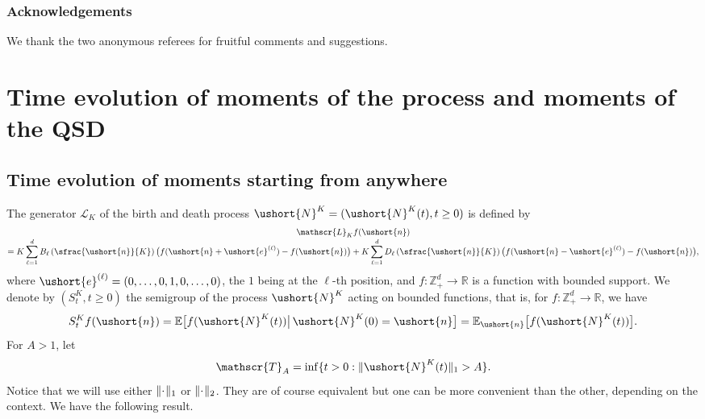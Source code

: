 \documentclass[JEP,XML,SOM,Unicode]{cedram}
\let\mathcal\mathscr
\numberwithin{equation}{section}
\theoremstyle{plain}
\theoremstyle{definition}
\newcommand{\E}{{\mathbb{E}}}
\newcommand{\real}{\mathbb{R}}
\newcommand{\zentiers}{{\mathbb{Z}}}
\newcommand{\domaine}{\zentiers_{+}^{d}}
\newcommand{\sK}{K}
\newcommand{\gen}{\mathscr{L}_{\sK}}
\newcommand{\vecn}{\ushort{n}}
\newcommand{\vece}[1]{\ushort{e}^{(#1)}}
\newcommand{\leproc}{\ushort{N}^{K}}
\newcommand{\norm}[1]{\|#1\|_{1}}\let\snorm\norm
\newcommand{\normdeux}[1]{\|#1\|_{2}}\let\snormdeux\normdeux
\begin{document}
\subsubsection*{Acknowledgements}
We thank the two anonymous referees for fruitful comments and suggestions.

\section{Time evolution of moments of the process and moments of the QSD}
\label{moment-process}

\subsection{Time evolution of moments starting from anywhere}
The generator $\gen$ of the birth and death process $\leproc=(\leproc(t),t\geq 0)$ is defined by
\begin{multline}\label{gene}
\gen f(\vecn)\\[-3pt]
= K\sum_{\ell=1}^{d}B_{\ell}\left(\sfrac{\vecn}{K}\right)\bigl(f(\vecn+\vece{\ell})-f(\vecn)\bigr)
+K\sum_{\ell=1}^{d}D_{\ell}\left(\sfrac{\vecn}{K}\right)\bigl(f(\vecn-\vece{\ell})-f(\vecn)\bigr),
\end{multline}
where $\vece{\ell}=(0,\ldots,0,1,0,\ldots,0)$, the $1$ being
at the $\ell$-th position, and $f:\domaine\to\real$ is a function with bounded support.
We denote by $(S^{\sK}_{t},t\geq 0)$ the semigroup of the process $\leproc$ acting on bounded
functions, that is, for $f:\domaine\to\real$, we have
\[
S^{\sK}_{t}f(\vecn)
=\E\bigl[f(\leproc(t))\big|\, \leproc(0)=\vecn\bigr]
=\E_{\vecn}\bigl[f(\leproc(t))\bigr].
\]
For $A>1$, let
\begin{equation}\label{leTA}
\mathcal{T}_A=\inf\{t>0:\|\leproc(t)\|_1>A\}.
\end{equation}
Notice that we will use either $\norm{\!\hspace{-0.5pt}\cdot\!}$ or $\normdeux{\!\hspace{-0.5pt}\cdot\!}$. They are of course equivalent but one can be more convenient than the other, depending on the context.
We have the following result.
\end{document}
